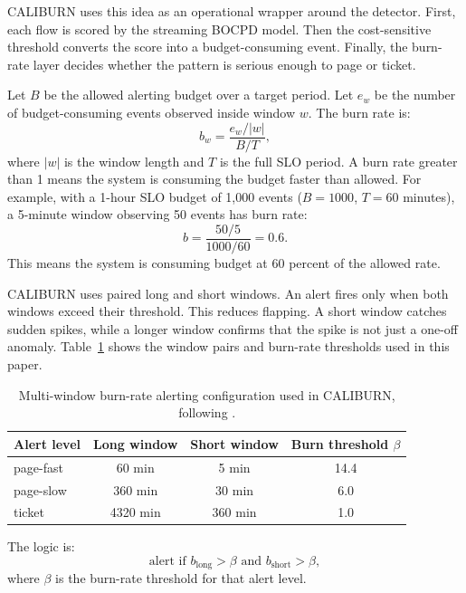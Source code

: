 \documentclass[preprint,12pt,authoryear]{elsarticle}
\newcommand{\caliburn}{CALIBURN}
\begin{document}
\caliburn{} uses this idea as an operational wrapper around the detector. First, each flow is scored by the streaming BOCPD model. Then the cost-sensitive threshold converts the score into a budget-consuming event. Finally, the burn-rate layer decides whether the pattern is serious enough to page or ticket.

Let $B$ be the allowed alerting budget over a target period. Let $e_w$ be the number of budget-consuming events observed inside window $w$. The burn rate is:
\begin{equation}
    b_w = \frac{e_w / |w|}{B / T},
    \label{eq:burn-rate}
\end{equation}
where $|w|$ is the window length and $T$ is the full SLO period. A burn rate greater than 1 means the system is consuming the budget faster than allowed. For example, with a 1-hour SLO budget of 1{,}000 events ($B = 1000$, $T = 60$ minutes), a 5-minute window observing 50 events has burn rate:
\begin{equation}
    b = \frac{50/5}{1000/60} = 0.6.
\end{equation}
This means the system is consuming budget at 60 percent of the allowed rate.

\caliburn{} uses paired long and short windows. An alert fires only when both windows exceed their threshold. This reduces flapping. A short window catches sudden spikes, while a longer window confirms that the spike is not just a one-off anomaly. Table~\ref{tab:burn-rate-windows} shows the window pairs and burn-rate thresholds used in this paper.

\begin{table}[ht]
\centering
\caption{Multi-window burn-rate alerting configuration used in \caliburn{}, following \citet{beyer2018workbook}.}
\label{tab:burn-rate-windows}
\begin{tabular}{lccc}
\toprule
Alert level  & Long window & Short window & Burn threshold $\beta$ \\
\midrule
page-fast    & 60 min      & 5 min        & 14.4 \\
page-slow    & 360 min     & 30 min       & 6.0  \\
ticket       & 4320 min    & 360 min      & 1.0  \\
\bottomrule
\end{tabular}
\end{table}

The logic is:
\begin{equation}
    \text{alert if } b_{\text{long}} > \beta \text{ and } b_{\text{short}} > \beta,
\end{equation}
where $\beta$ is the burn-rate threshold for that alert level.
\end{document}
